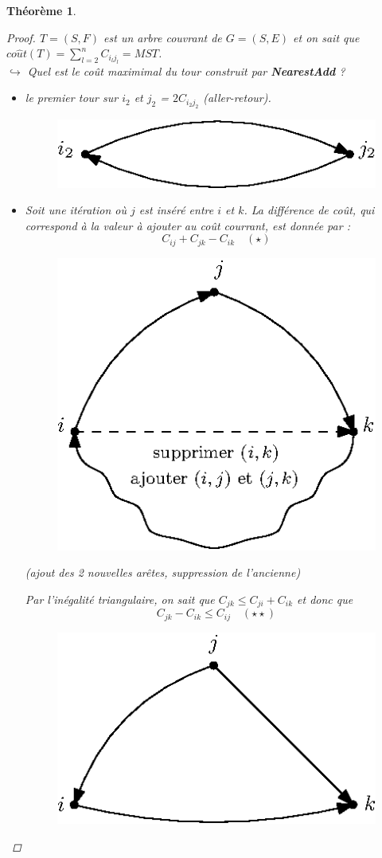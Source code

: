 \documentclass[12pt]{article}
\newtheorem{thm}{Th\'eor\`eme}[section]
\newtheorem{proof}{Preuve}[section]
\begin{document}
\begin{thm}
\begin{proof}
\noindent $T = (S,F)$ est un arbre couvrant de $G=(S,E)$ et on sait que $co\hat{u}t(T) = \sum_{l=2}^n C_{i_lj_l} = MST$.\\
$\hookrightarrow$ Quel est le coût maximimal du tour construit par \textbf{NearestAdd} ?
\begin{itemize}
\item[$\rightarrow$] le premier tour sur $i_2$ et $j_2$ = $2C_{i_2j_2}$ (aller-retour).
\begin{figure}[H]
	\centering
	\includegraphics{neartestAdd1}
\end{figure}
\item[$\rightarrow$] Soit une itération où $j$ est inséré entre $i$ et $k$. La différence de coût, qui correspond à la valeur à ajouter au coût courrant, est donnée par :
$$C_{ij}+C_{jk}-C_{ik}\quad (\star )$$
\begin{figure}[H]
	\centering
	\includegraphics{neartestAdd2}
\end{figure}
\begin{center}\textit{(ajout des 2 nouvelles arêtes, suppression de l'ancienne)}\end{center}
Par l'inégalité triangulaire, on sait que $C_{jk}\leq C_{ji} + C_{ik}$ et donc que
$$C_{jk}-C_{ik} \leq C_{ij}\quad (\star\star )$$
\begin{figure}[H]
	\centering
	\includegraphics{neartestAdd3}
\end{figure}


\end{itemize}
\end{proof}
\end{thm}
\end{document}
